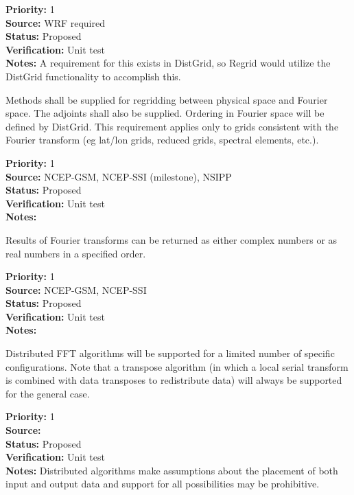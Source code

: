 \begin{reqlist}
{\bf Priority:} 1 \\
{\bf Source:}  WRF required \\
{\bf Status:} Proposed \\
{\bf Verification:} Unit test \\
{\bf Notes:} A requirement for this exists in DistGrid, so
             Regrid would utilize the DistGrid functionality to 
             accomplish this.
\end{reqlist}


Methods shall be supplied for regridding between physical space and
Fourier space.  The adjoints shall also be supplied.  Ordering in
Fourier space will be defined by DistGrid.  This requirement applies only
to grids consistent with the Fourier transform (eg lat/lon grids,
reduced grids, spectral elements, etc.).

\begin{reqlist}
{\bf Priority:} 1 \\
{\bf Source:}  NCEP-GSM, NCEP-SSI (milestone), NSIPP \\
{\bf Status:} Proposed \\
{\bf Verification:} Unit test \\
{\bf Notes:} 
\end{reqlist}


Results of Fourier transforms can be returned as either
complex numbers or as real numbers in a specified order.

\begin{reqlist}
{\bf Priority:} 1 \\
{\bf Source:}  NCEP-GSM, NCEP-SSI \\
{\bf Status:} Proposed \\
{\bf Verification:} Unit test \\
{\bf Notes:} 
\end{reqlist}


Distributed FFT algorithms will be supported for a limited
number of specific configurations.  Note that a transpose
algorithm (in which a local serial transform is combined
with data transposes to redistribute data) will always
be supported for the general case.

\begin{reqlist}
{\bf Priority:} 1 \\
{\bf Source:}  \\
{\bf Status:} Proposed \\
{\bf Verification:} Unit test \\
{\bf Notes:} Distributed algorithms make assumptions about
             the placement of both input and output data and
             support for all possibilities may be prohibitive.
\end{reqlist}

